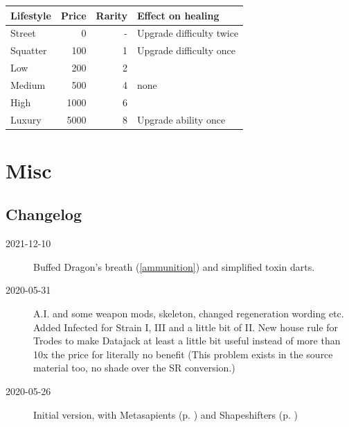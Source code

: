 \documentclass{book}
\begin{document}
\RowColors
\begin{tabular}{ l r r l }
	\rowcolor{tablegold}
	\color{white}\textbf{Lifestyle} & Price & Rarity & Effect on healing\\
	\hline
	Street & 0 & - & Upgrade difficulty twice\\		
	Squatter & 100 & 1 & Upgrade difficulty once \\				
	Low & 200 & 2 & \SetbackDie \SetbackDie \\
	Medium & 500 & 4 & none \\
	High & 1000 & 6 & \BoostDie \BoostDie \\
	Luxury & 5000 & 8 & Upgrade ability once \\		
\end{tabular}


\printindex

\appendix
\chapter{Misc}
\section{Changelog}
\begin{description}
	\item[2021-12-10] Buffed Dragon's breath (\ref{ammunition}) and simplified toxin darts.
	\item[2020-05-31] A.I. and some weapon mods, skeleton, changed regeneration wording etc. Added Infected \pageref{sec:gettinginfected} for Strain I, III and a little bit of II. New house rule for Trodes to make Datajack at least a little bit useful instead of more than 10x the price for literally no benefit (This problem exists in the source material too, no shade over the SR conversion.)
	\item[2020-05-26] Initial version, with Metasapients (p. \pageref{sec:metasapients}) and Shapeshifters (p. \pageref{sec:shapeshifters}) 
\end{description}
\end{document}
